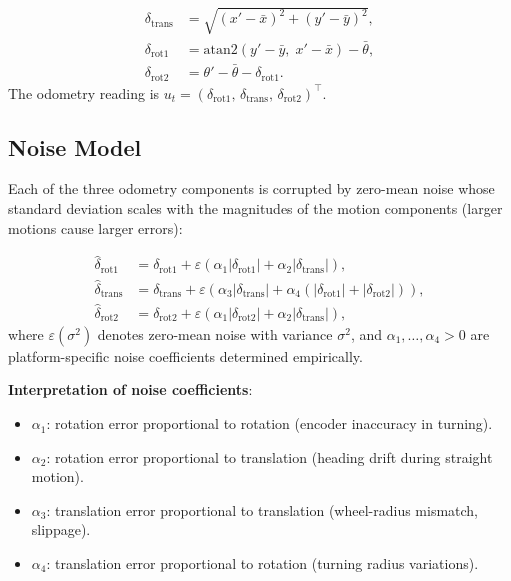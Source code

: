 \documentclass[11pt,a4paper]{article}
\theoremstyle{definition}
\theoremstyle{plain}
\theoremstyle{remark}
\begin{document}
\begin{tcolorbox}[colback=blue!5!white,colframe=blue!75!black,title=\textbf{Odometry Decomposition}]
\begin{align*}
    \delta_{\mathrm{trans}} &= \sqrt{(x' - \bar{x})^2 + (y' - \bar{y})^2}, \\ %
    \delta_{\mathrm{rot1}}  &= \mathrm{atan2}(y' - \bar{y},\; x' - \bar{x}) - \bar{\theta}, \\
    \delta_{\mathrm{rot2}}  &= \theta' - \bar{\theta} - \delta_{\mathrm{rot1}}.
\end{align*}
The odometry reading is $u_t = (\delta_{\mathrm{rot1}},\, \delta_{\mathrm{trans}},\, \delta_{\mathrm{rot2}})^\top$. %
\end{tcolorbox}

\subsection{Noise Model}

Each of the three odometry components is corrupted by zero-mean noise whose standard deviation scales with the magnitudes of the motion components (larger motions cause larger errors):

\begin{tcolorbox}[colback=blue!5!white,colframe=blue!75!black,title=\textbf{Odometry Noise Model}]
\begin{align*}
    \hat{\delta}_{\mathrm{rot1}}  &= \delta_{\mathrm{rot1}}  + \varepsilon\!\left(\alpha_1|\delta_{\mathrm{rot1}}| + \alpha_2|\delta_{\mathrm{trans}}|\right), \\
    \hat{\delta}_{\mathrm{trans}} &= \delta_{\mathrm{trans}} + \varepsilon\!\left(\alpha_3|\delta_{\mathrm{trans}}| + \alpha_4(|\delta_{\mathrm{rot1}}| + |\delta_{\mathrm{rot2}}|)\right), \\
    \hat{\delta}_{\mathrm{rot2}}  &= \delta_{\mathrm{rot2}}  + \varepsilon\!\left(\alpha_1|\delta_{\mathrm{rot2}}| + \alpha_2|\delta_{\mathrm{trans}}|\right),
\end{align*}
where $\varepsilon(\sigma^2)$ denotes zero-mean noise with variance $\sigma^2$, and $\alpha_1, \ldots, \alpha_4 > 0$ are platform-specific noise coefficients determined empirically.
\end{tcolorbox}

\textbf{Interpretation of noise coefficients}:
\begin{itemize}
    \item $\alpha_1$: rotation error proportional to rotation (encoder inaccuracy in turning).
    \item $\alpha_2$: rotation error proportional to translation (heading drift during straight motion).
    \item $\alpha_3$: translation error proportional to translation (wheel-radius mismatch, slippage).
    \item $\alpha_4$: translation error proportional to rotation (turning radius variations).
\end{itemize}
\end{document}
